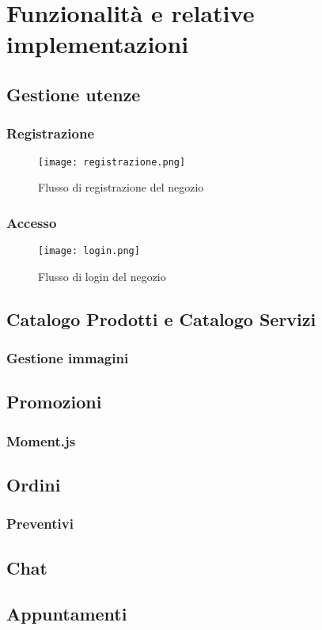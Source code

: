 \chapter{Funzionalità e relative implementazioni}
\section{Gestione utenze}
\subsection{Registrazione}
\begin{figure}[!htb]
    \centering
    \texttt{[image: registrazione.png]}
    \caption{Flusso di registrazione del negozio}
\end{figure}
\subsection{Accesso}
\begin{figure}[!htb]
    \centering
    \texttt{[image: login.png]}
    \caption{Flusso di login del negozio}
\end{figure}
\section{Catalogo Prodotti e Catalogo Servizi}
\subsection{Gestione immagini}
\section{Promozioni}
\subsection{Moment.js}
\section{Ordini}
\subsection{Preventivi}
\section{Chat}
\section{Appuntamenti}